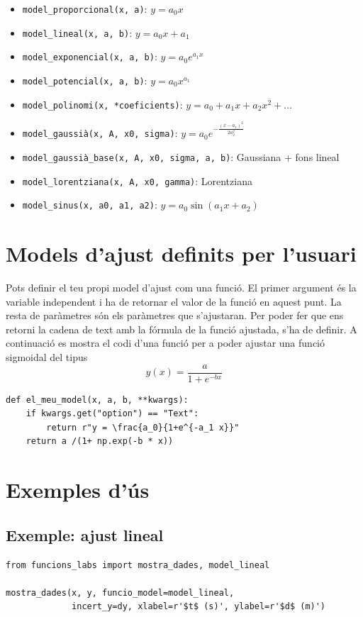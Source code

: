 \documentclass[11pt,a4paper]{article}
\begin{document}
\begin{itemize}
 \item \texttt{model\_proporcional(x, a)}: \( y = a_0 x  \)
  \item \texttt{model\_lineal(x, a, b)}: \( y = a_0 x + a_1 \)
  \item \texttt{model\_exponencial(x, a, b)}: \( y = a_0 e^{a_1 x} \)
  \item \texttt{model\_potencial(x, a, b)}: \( y = a_0 x^{a_1} \)
  \item \texttt{model\_polinomi(x, *coeficients)}: \( y = a_0 + a_1 x + a_2 x^2 + \dots \)
  \item \texttt{model\_gaussià(x, A, x0, sigma)}: \( y = a_0 e^{-\frac{(x - a_1)^2}{2 a_2^2}} \)
  \item \texttt{model\_gaussià\_base(x, A, x0, sigma, a, b)}: Gaussiana + fons lineal
  \item \texttt{model\_lorentziana(x, A, x0, gamma)}: Lorentziana
  \item \texttt{model\_sinus(x, a0, a1, a2)}: \( y = a_0 \sin(a_1 x + a_2) \)
\end{itemize}

\section{Models d'ajust definits per l'usuari}
Pots definir el teu propi model d'ajust com una funció. El primer argument és la variable independent i
 ha de retornar el valor de la funció en aquest punt. La resta de paràmetres són els paràmetres que s'ajustaran.
 Per poder fer que ens retorni la cadena de text amb la fórmula de la funció ajustada, s'ha de definir. 
 A continuació es mostra el codi d'una funció per a poder ajustar una funció sigmoidal del tipus 
 $$y(x)=\frac{a}{1+e^{-b x}}$$
 
\begin{lstlisting}
def el_meu_model(x, a, b, **kwargs):
    if kwargs.get("option") == "Text":
        return r"y = \frac{a_0}{1+e^{-a_1 x}}"
    return a /(1+ np.exp(-b * x))
\end{lstlisting}

\section{Exemples d’ús}


\subsection*{Exemple: ajust lineal}
\begin{lstlisting}
from funcions_labs import mostra_dades, model_lineal

mostra_dades(x, y, funcio_model=model_lineal, 
             incert_y=dy, xlabel=r'$t$ (s)', ylabel=r'$d$ (m)')
\end{lstlisting}
\end{document}
